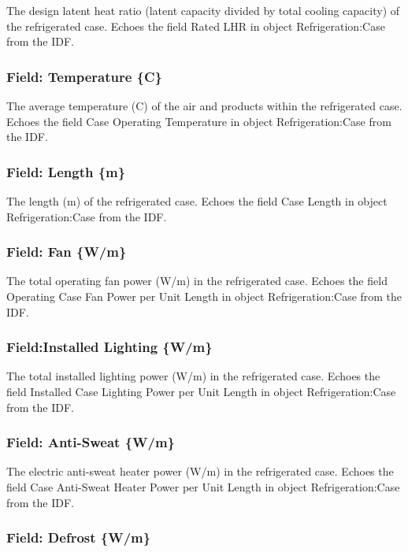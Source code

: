 The design latent heat ratio (latent capacity divided by total cooling capacity) of the refrigerated case. Echoes the field Rated LHR in object Refrigeration:Case from the IDF.

\subsubsection{Field: Temperature \{C\}}\label{field-temperature-c}

The average temperature (C) of the air and products within the refrigerated case. Echoes the field Case Operating Temperature in object Refrigeration:Case from the IDF.

\subsubsection{Field: Length \{m\}}\label{field-length-m}

The length (m) of the refrigerated case. Echoes the field Case Length in object Refrigeration:Case from the IDF.

\subsubsection{Field: Fan \{W/m\}}\label{field-fan-wm}

The total operating fan power (W/m) in the refrigerated case. Echoes the field Operating Case Fan Power per Unit Length in object Refrigeration:Case from the IDF.

\subsubsection{Field:Installed Lighting \{W/m\}}\label{fieldinstalled-lighting-wm}

The total installed lighting power (W/m) in the refrigerated case. Echoes the field Installed Case Lighting Power per Unit Length in object Refrigeration:Case from the IDF.

\subsubsection{Field: Anti-Sweat \{W/m\}}\label{field-anti-sweat-wm}

The electric anti-sweat heater power (W/m) in the refrigerated case. Echoes the field Case Anti-Sweat Heater Power per Unit Length in object Refrigeration:Case from the IDF.

\subsubsection{Field: Defrost \{W/m\}}\label{field-defrost-wm}

